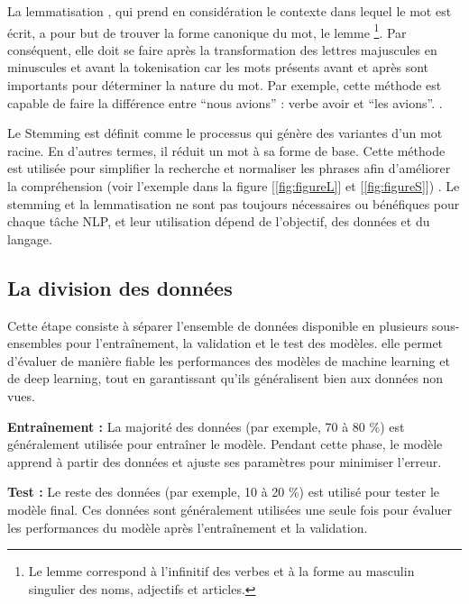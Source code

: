 
La lemmatisation \cite{coddity_nlp_blog}, qui prend en considération le contexte dans lequel le mot est écrit, a pour but de trouver la forme canonique du mot, le lemme \footnote{Le lemme correspond à l’infinitif des verbes et à la forme au masculin singulier des noms, adjectifs et articles.}. Par conséquent, elle doit se faire après la transformation des lettres majuscules en minuscules et avant la tokenisation car les mots présents avant et après sont importants pour déterminer la nature du mot.
 Par exemple, cette méthode est capable de faire la différence entre “nous avions” : verbe avoir et “les avions”. \cite{coddity_nlp_blog}.

Le Stemming est  définit comme le processus qui génère des variantes d'un mot racine. En d'autres termes, il réduit un mot à sa forme de base. Cette méthode est utilisée pour simplifier la recherche et normaliser les phrases afin d'améliorer la compréhension (voir l'exemple dans la figure [\ref{fig:figureL}] et [\ref{fig:figureS}])
.
Le stemming et la lemmatisation ne sont pas toujours nécessaires ou bénéfiques pour chaque tâche NLP, et leur utilisation dépend de l’objectif, des données et du langage.




\subsection{La division des données}
Cette étape consiste à séparer l'ensemble de données disponible en plusieurs sous-ensembles pour l'entraînement, la validation et le test des modèles. elle  permet d'évaluer de manière fiable les performances des modèles de machine learning et de deep learning, tout en garantissant qu'ils généralisent bien aux données non vues.

\begin{itemize}
    \item {\textbf{Entraînement :} La majorité des données (par exemple, 70 à 80 \%) est généralement utilisée pour entraîner le modèle. Pendant cette phase, le modèle apprend à partir des données et ajuste ses paramètres pour minimiser l'erreur.
    \item \textbf{Test :} Le reste des données (par exemple, 10 à 20 \%) est utilisé pour tester le modèle final. Ces données sont généralement utilisées une seule fois pour évaluer les performances du modèle après l'entraînement et la validation.}
\end{itemize}


